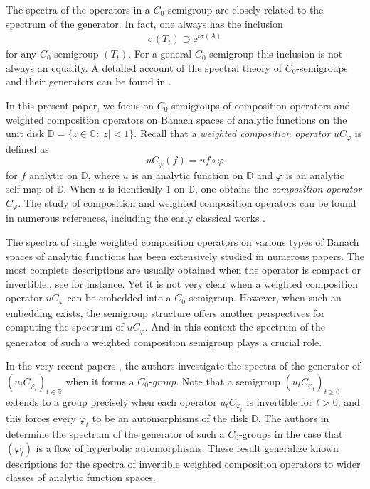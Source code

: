 \documentclass{amsart}
\theoremstyle{proclaim}
\theoremstyle{fancyproclaim}
\theoremstyle{definition}
\theoremstyle{fancystatement}
\numberwithin{equation}{section}
\begin{document}
The spectra of the operators in a $C_0$-semigroup are closely related to the spectrum of the generator. In fact, one always has the inclusion
\begin{align}\label{SMT0}
\sigma(T_t) \supset  \mathrm{e}^{t\sigma(A)}
\end{align}
for any  $C_0$-semigroup $(T_t)$. For a general $C_0$-semigroup this inclusion is not always an equality. A detailed account of the spectral theory of $C_0$-semigroups and their generators can be found in \cite{equ}. 

In this present paper, we focus on $C_0$-semigroups of composition operators and weighted composition operators on Banach spaces of analytic functions on the unit disk $\mathbb{D} = \{z \in \mathbb{C} : |z| < 1\}$. Recall that a \emph{weighted composition operator} $uC_\varphi$ is defined as
$$uC_\varphi (f) =u  f \circ\varphi$$
for $f$ analytic on $\mathbb{D}$, where $u$ is an analytic function on $\mathbb{D}$ and $\varphi$ is an analytic self-map of $\mathbb{D}$. When $u$ is identically $1$ on $\mathbb{D}$, one obtains the \emph{composition operator} $C_\varphi$. The study of composition and weighted composition operators can be found in numerous references, including the early classical works \cite{COW, FOR, NOR, SHA}.

The spectra of single weighted composition operators on various types of Banach spaces of analytic functions has been extensively studied in numerous papers.  The most complete descriptions are usually obtained when the operator is compact or invertible., see \cite{sp4,sp1,sp2,sp3} for instance.  Yet it is not very clear when a weighted composition operator $uC_\varphi$ can be embedded into a $C_0$-semigroup. However, when such an embedding exists, the semigroup structure offers another perspectives for computing the spectrum of $uC_\varphi$. And in this context the spectrum of the generator of such a weighted composition semigroup plays a crucial role.

In the very recent papers \cite{aim,jfa}, the authors investigate the spectra of the generator of $(u_tC_{\varphi_t})_{t\in\mathbb{R}}$ when it forms a $C_0$-\emph{group}. Note that a semigroup $(u_tC_{\varphi_t})_{t\geq 0}$ extends to a group precisely when each operator $u_tC_{\varphi_t}$ is invertible for $t>0$, and this forces every $\varphi_t$ to be an automorphisms of the disk $\mathbb{D}$. The authors in \cite{aim} determine the spectrum of the generator of such a $C_0$-groups in the case that $(\varphi_t)$ is a flow of hyperbolic automorphisms. These result generalize known descriptions for the spectra of invertible weighted composition operators to wider classes of analytic function spaces.
\end{document}
